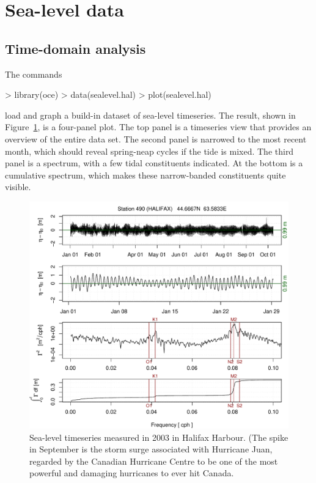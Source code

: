 \documentclass{article}
\begin{document}
\section{Sea-level data}

\subsection{Time-domain analysis}


The commands
\begin{Schunk}
\begin{Sinput}
> library(oce)
> data(sealevel.hal)
> plot(sealevel.hal)
\end{Sinput}
\end{Schunk}
load and graph a build-in dataset of sea-level timeseries. The result, shown in
Figure~\ref{fig:sealevel}, is a four-panel plot. The top panel is a timeseries
view that provides an overview of the entire data set. The second panel is
narrowed to the most recent month, which should reveal spring-neap cycles if the
tide is mixed. The third panel is a spectrum, with a few tidal constituents
indicated. At the bottom is a cumulative spectrum, which makes these
narrow-banded constituents quite visible.

\begin{figure}
\begin{center}
\includegraphics{oce-sealevelfig}
\end{center}
\caption{Sea-level timeseries measured in 2003 in Halifax Harbour.  (The spike
in September is the storm surge associated with Hurricane Juan, regarded by the
Canadian Hurricane Centre to be one of the most powerful and damaging hurricanes
to ever hit Canada.}
\label{fig:sealevel}
\end{figure}
\end{document}
